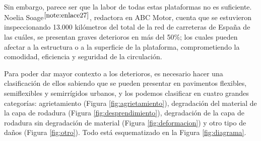 Sin embargo, parece ser que la labor de todas estas plataformas no es suficiente. Noelia Soage$^{\ref{note:enlace27}}$, redactora en ABC Motor, cuenta que se estuvieron inspeccionando 13.000 kilómetros del total de la red de carreteras de España de las cuáles, se presentan graves deterioros en más del 50\%; los cuales pueden afectar a la estructura o a la superficie de la plataforma, comprometiendo la comodidad, eficiencia y seguridad de la circulación.


Para poder dar mayor contexto a los deterioros, es necesario hacer una clasificación de ellos sabiendo que se pueden presentar en pavimentos flexibles, semiflexibles y semirrígidos urbanos, y los podemos clasificar en cuatro grandes categorías: agrietamiento (Figura \ref{fig:agrietamiento}), degradación del material de la capa de rodadura (Figura \ref{fig:desprendimiento}), degradación de la capa de rodadura sin degradación de material (Figura \ref{fig:deformacion}) y otro tipo de daños (Figura \ref{fig:otro}). Todo está esquematizado en la Figura \ref{fig:diagrama}.

\setcounter{footnote}{27} %

